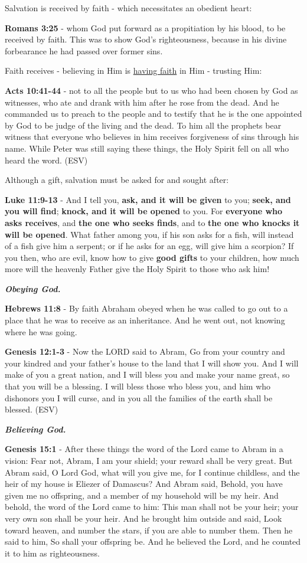 \documentclass[11pt]{article}
\begin{document}
Salvation is received by faith - which necessitates an obedient heart:

\textbf{Romans 3:25} - whom God put forward as a propitiation by his blood, to be received by faith. This was to show God's righteousness, because in his divine forbearance he had passed over former sins.

Faith receives - believing in Him is \uline{having faith} in Him - trusting Him:

\textbf{Acts 10:41-44} - not to all the people but to us who had been chosen by God as witnesses, who ate and drank with him after he rose from the dead. And he commanded us to preach to the people and to testify that he is the one appointed by God to be judge of the living and the dead. To him all the prophets bear witness that everyone who believes in him receives forgiveness of sins through his name. While Peter was still saying these things, the Holy Spirit fell on all who heard the word. (ESV)

Although a gift, salvation must be asked for and sought after:

\textbf{Luke 11:9-13} - And I tell you, \textbf{ask, and it will be given} to you; \textbf{seek, and you will find}; \textbf{knock, and it will be opened} to you.  For \textbf{everyone who asks receives}, and \textbf{the one who seeks finds}, and to \textbf{the one who knocks it will be opened}.  What father among you, if his son asks for a fish, will instead of a fish give him a serpent; or if he asks for an egg, will give him a scorpion?  If you then, who are evil, know how to give \textbf{good gifts} to your children, how much more will the heavenly Father give the Holy Spirit to those who ask him!

\emph{\textbf{Obeying God.}}

\textbf{Hebrews 11:8} - By faith Abraham obeyed when he was called to go out to a place that he was to receive as an inheritance. And he went out, not knowing where he was going.

\textbf{Genesis 12:1-3} - Now the LORD said to Abram, Go from your country and your kindred and your father's house to the land that I will show you. And I will make of you a great nation, and I will bless you and make your name great, so that you will be a blessing. I will bless those who bless you, and him who dishonors you I will curse, and in you all the families of the earth shall be blessed. (ESV)

\emph{\textbf{Believing God.}}

\textbf{Genesis 15:1} - After these things the word of the Lord came to Abram in a vision: Fear not, Abram, I am your shield; your reward shall be very great. But Abram said, O Lord God, what will you give me, for I continue childless, and the heir of my house is Eliezer of Damascus? And Abram said, Behold, you have given me no offspring, and a member of my household will be my heir. And behold, the word of the Lord came to him: This man shall not be your heir; your very own son shall be your heir. And he brought him outside and said, Look toward heaven, and number the stars, if you are able to number them. Then he said to him, So shall your offspring be. And he believed the Lord, and he counted it to him as righteousness.
\end{document}
